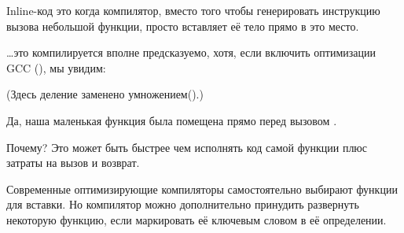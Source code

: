 \label{inline_code}

Inline-код это когда компилятор, вместо того чтобы генерировать инструкцию вызова небольшой функции,
просто вставляет её тело прямо в это место.



\dots это компилируется вполне предсказуемо, хотя, если включить оптимизации GCC (\Othree), мы увидим:



(Здесь деление заменено умножением().)

Да, наша маленькая функция  была помещена прямо перед вызовом \printf.

Почему? Это может быть быстрее чем исполнять код самой функции плюс затраты на вызов и возврат.

Современные оптимизирующие компиляторы самостоятельно выбирают функции для вставки.
Но компилятор можно дополнительно принудить развернуть некоторую функцию, 
если маркировать её ключевым словом  в её определении.


